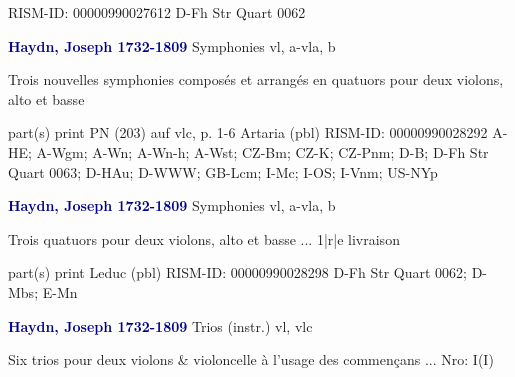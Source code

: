 \documentclass[twocolumn]{book}
\begin{document}
\newline RISM-ID: 00000990027612
\newline D-Fh  Str Quart 0062
\newline \par \vspace{7pt} \textcolor{darkblue}{\textbf{Haydn, Joseph  1732-1809}}
\newline Symphonies
 vl, a-vla, b
\newline \begin{itshape}Trois nouvelles symphonies composés et arrangés en quatuors pour deux violons, alto et basse\end{itshape} 
\newline \textcolor{darkblue}{}  part(s)
\newline print
\newline PN (203) auf vlc, p. 1-6
\newline Artaria  (pbl)
\newline RISM-ID: 00000990028292
\newline A-HE; A-Wgm; A-Wn; A-Wn-h; A-Wst; CZ-Bm; CZ-K; CZ-Pnm; D-B; D-Fh  Str Quart 0063; D-HAu; D-WWW; GB-Lcm; I-Mc; I-OS; I-Vnm; US-NYp
\newline \par \vspace{7pt} \textcolor{darkblue}{\textbf{Haydn, Joseph  1732-1809}}
\newline Symphonies
 vl, a-vla, b
\newline \begin{itshape}Trois quatuors pour deux violons, alto et basse ... 1|r|e livraison\end{itshape} 
\newline \textcolor{darkblue}{}  part(s)
\newline print
\newline Leduc  (pbl)
\newline RISM-ID: 00000990028298
\newline D-Fh  Str Quart 0062; D-Mbs; E-Mn
\newline \par \vspace{7pt} \textcolor{darkblue}{\textbf{Haydn, Joseph  1732-1809}}
\newline Trios (instr.)
 vl, vlc
\newline \begin{itshape}Six trios pour deux violons \& violoncelle à l'usage des commençans ... Nro: I(I)\end{itshape} 
\end{document}
